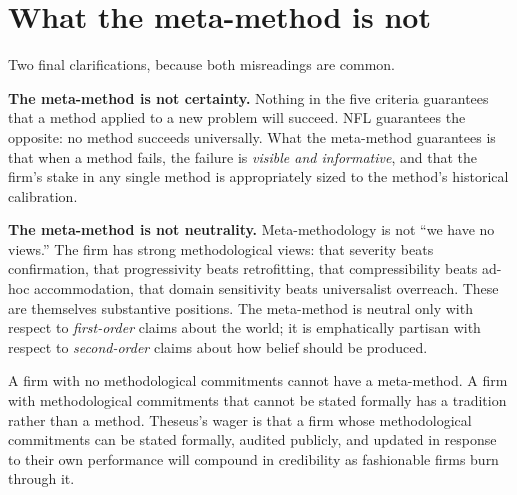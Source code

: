 \documentclass[11pt,letterpaper]{article}
\begin{document}
\section{What the meta-method is not}

Two final clarifications, because both misreadings are common.

\textbf{The meta-method is not certainty.} Nothing in the five criteria guarantees that a method applied to a new problem will succeed. NFL guarantees the opposite: no method succeeds universally. What the meta-method guarantees is that when a method fails, the failure is \emph{visible and informative}, and that the firm's stake in any single method is appropriately sized to the method's historical calibration.

\textbf{The meta-method is not neutrality.} Meta-methodology is not ``we have no views.'' The firm has strong methodological views: that severity beats confirmation, that progressivity beats retrofitting, that compressibility beats ad-hoc accommodation, that domain sensitivity beats universalist overreach. These are themselves substantive positions. The meta-method is neutral only with respect to \emph{first-order} claims about the world; it is emphatically partisan with respect to \emph{second-order} claims about how belief should be produced.

A firm with no methodological commitments cannot have a meta-method. A firm with methodological commitments that cannot be stated formally has a tradition rather than a method. Theseus's wager is that a firm whose methodological commitments can be stated formally, audited publicly, and updated in response to their own performance will compound in credibility as fashionable firms burn through it.
\end{document}

